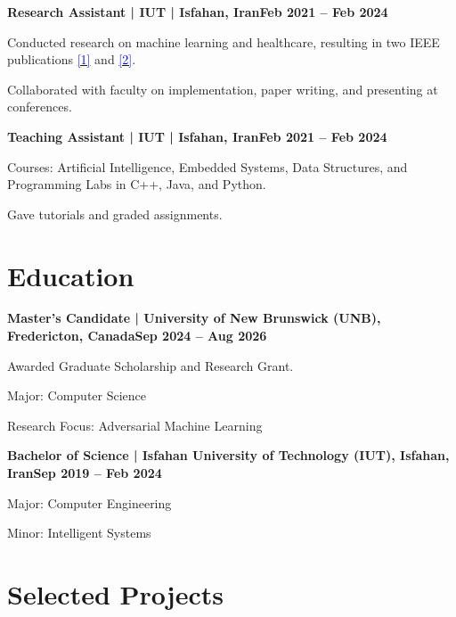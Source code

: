 \documentclass[letterpaper,10pt]{article}
\newcommand{\heading}[2]{
  \hspace{10pt}#1\hfill#2\\
}
\newcommand{\headingBf}[2]{
  \heading{\textbf{#1}}{\textbf{#2}}
}
\newenvironment{resume_list}{
  \vspace{-7pt}
  \begin{itemize}[itemsep=-2px, parsep=1pt, leftmargin=30pt]
}{
  \end{itemize}
}
\begin{document}
\headingBf{Research Assistant | IUT | Isfahan, Iran}{Feb 2021 -- Feb 2024}
\begin{resume_list}
    \item Conducted research on machine learning and healthcare, resulting in two IEEE publications
      \href{https://ieeexplore.ieee.org/abstract/document/10326310}{\textcolor{blue}{[1]}} and
      \href{https://ieeexplore.ieee.org/abstract/document/10334666}{\textcolor{blue}{[2]}}.
    \item Collaborated with faculty on implementation, paper writing, and presenting at conferences.
\end{resume_list}

\headingBf{Teaching Assistant | IUT | Isfahan, Iran}{Feb 2021 -- Feb 2024}
\begin{resume_list}
    \item Courses: Artificial Intelligence, Embedded Systems, Data Structures, and Programming Labs in C++, Java, and Python.
    \item Gave tutorials and graded assignments.
\end{resume_list}



\section{Education}

\headingBf{Master’s Candidate | University of New Brunswick (UNB), Fredericton, Canada}{Sep 2024 -- Aug 2026}
\begin{resume_list}
  \item Awarded Graduate Scholarship and Research Grant.
  \item Major: Computer Science
  \item Research Focus: Adversarial Machine Learning
\end{resume_list}

\headingBf{Bachelor of Science | Isfahan University of Technology (IUT), Isfahan, Iran}{Sep 2019 -- Feb 2024}
\begin{resume_list}
  \item Major: Computer Engineering
  \item Minor: Intelligent Systems
\end{resume_list}



\section{Selected Projects}
\end{document}
